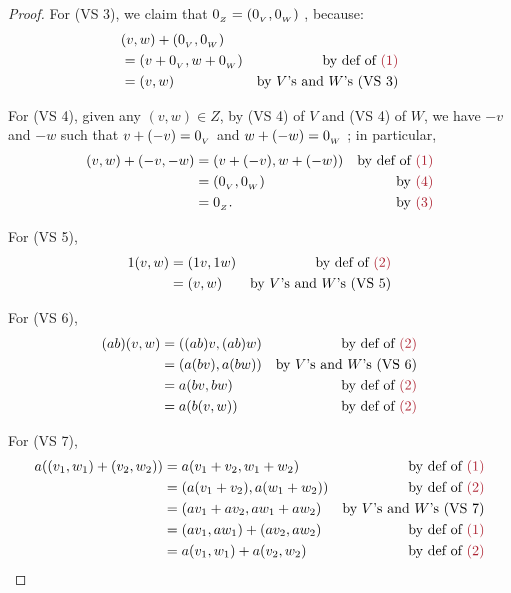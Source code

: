 \begin{proof}
For (VS 3), we claim that \(0_{_Z} = (0_{_V}, 0_{_W})\) , because:
\begin{align*}
    & (v, w) + (\OV, \OW) \\
    & = (v + \OV, w + \OW) & \text{by def of \MAROON{(1)}} \\
    & = (v, w) & \text{by \(V\)'s and \(W\)'s (VS 3)}
\end{align*}

For (VS 4), given any \((v, w) \in Z\), by (VS 4) of \(V\) and (VS 4) of \(W\), we have \(-v\) and \(-w\) such that \(v + (-v) = 0_{_V}\) and \(w + (-w) = 0_{_W}\) ;
in particular,
\begin{align*}
    (v, w) + (-v, -w) & = (v + (-v), w + (-w)) & \text{by def of \MAROON{(1)}} \\
                      & = (\OV, \OW) & \text{by \MAROON{(4)}} \\
                      & = 0_{_Z}. & \text{by \MAROON{(3)}}
\end{align*}

For (VS 5),
\begin{align*}
    1 (v, w) & = (1v, 1w) & \text{by def of \MAROON{(2)}} \\
             & = (v, w) & \text{by \(V\)'s and \(W\)'s (VS 5)}
\end{align*}

For (VS 6),
\begin{align*}
    (ab) (v, w) & = ((ab) v, (ab) w) & \text{by def of \MAROON{(2)}} \\
                & = (a(bv), a(bw)) & \text{by \(V\)'s and \(W\)'s (VS 6)} \\
                & = a(bv, bw) & \text{by def of \MAROON{(2)}} \\
                & = a(b(v, w)) & \text{by def of \MAROON{(2)}}
\end{align*}
    
For (VS 7),
\begin{align*}
    a((v_1, w_1) + (v_2, w_2)) & = a(v_1 + v_2, w_1 + w_2) & \text{by def of \MAROON{(1)}} \\
                               & = (a(v_1 + v_2), a(w_1 + w_2)) & \text{by def of \MAROON{(2)}} \\
                               & = (a v_1 + a v_2, a w_1 + a w_2) & \text{by \(V\)'s and \(W\)'s (VS 7)} \\
                               & = (a v_1, a w_1) + (a v_2, a w_2) & \text{by def of \MAROON{(1)}} \\
                               & = a(v_1, w_1) + a(v_2, w_2) & \text{by def of \MAROON{(2)}}
\end{align*}
    

\end{proof}
